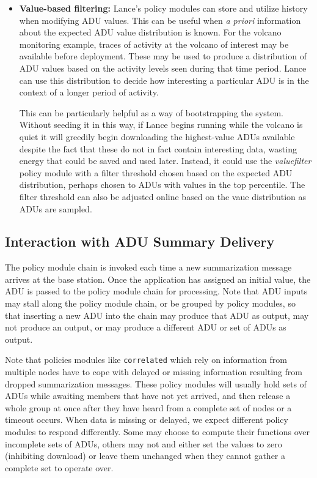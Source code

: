 \begin{itemize}
\item \textbf{Value-based filtering:} Lance's policy modules can store and
utilize history when modifying ADU values. This can be useful when \textit{a
priori} information about the expected ADU value distribution is known. For
the volcano monitoring example, traces of activity at the volcano of interest
may be available before deployment. These may be used to produce a
distribution of ADU values based on the activity levels seen during that time
period. Lance can use this distribution to decide how interesting a
particular ADU is in the context of a longer period of activity.

This can be particularly helpful as a way of bootstrapping the system.
Without seeding it in this way, if Lance begins running while the volcano is
quiet it will greedily begin downloading the highest-value ADUs available
despite the fact that these do not in fact contain interesting data, wasting
energy that could be saved and used later. Instead, it could use the
\textit{valuefilter} policy module with a filter threshold chosen based on
the expected ADU distribution, perhaps chosen to ADUs with values in the top
percentile. The filter threshold can also be adjusted online based on the
vaue distribution as ADUs are sampled.

\end{itemize}

\subsection{Interaction with ADU Summary Delivery}

The policy module chain is invoked each time a new summarization message
arrives at the base station. Once the application has assigned an initial
value, the ADU is passed to the policy module chain for processing. Note that
ADU inputs may stall along the policy module chain, or be grouped by policy
modules, so that inserting a new ADU into the chain may produce that ADU as
output, may not produce an output, or may produce a different ADU or set of
ADUs as output.

Note that policies modules like \texttt{correlated} which rely on information
from multiple nodes have to cope with delayed or missing information
resulting from dropped summarization messages. These policy modules will
usually hold sets of ADUs while awaiting members that have not yet arrived,
and then release a whole group at once after they have heard from a complete
set of nodes or a timeout occurs. When data is missing or delayed, we expect
different policy modules to respond differently. Some may choose to compute
their functions over incomplete sets of ADUs, others may not and either set
the values to zero (inhibiting download) or leave them unchanged when they
cannot gather a complete set to operate over.

